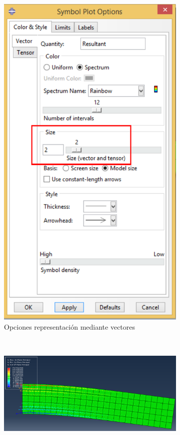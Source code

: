 \begin{enumerate}
\begin{figure}[H]
\begin{subfigure}{0.35\textwidth}
      \includegraphics[width=\textwidth]{./body/images/imagen85}
      \caption{Opciones representación mediante vectores}
      \label{figu85}
    \end{subfigure}%
    ~ %
    \begin{subfigure}{0.44\textwidth}
      \includegraphics[width=\textwidth]{./body/images/imagen86}

\end{subfigure}
\end{figure}
\end{enumerate}
